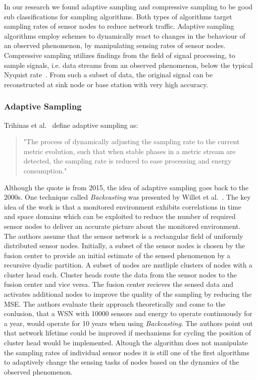 In our research we found adaptive sampling and compressive sampling to be good
sub classifications for sampling algorithms. Both types of algorithms target
sampling rates of sensor nodes to reduce network traffic. Adaptive sampling
algorithms employ schemes to dynamically react to changes in the behaviour of
an observed phenomenon, by manipulating sensing rates of sensor nodes.
Compressive sampling utilizes findings from the field of signal processing, to
sample signals, i.e. data streams from an observed phenomenon, below the
typical Nyquist rate~\cite{candes2008introduction}. From such a subset of data,
the original signal can be reconstructed at sink node or base station with very
high accuracy.

\subsubsection{Adaptive Sampling}
\label{sec:Adaptive Sampling}

Trihinas et al.~\cite{trihinas2015adam} define adaptive sampling as:

\begin{quote}
    "The process of dynamically adjusting the sampling rate to the current
    metric evolution, such that when stable phases in a metric stream are
    detected, the sampling rate is reduced to ease processing and energy
    consumption."
\end{quote}

\par
Although the quote is from 2015, the idea of adaptive sampling goes back to the
2000s. One technique called \textit{Backcasting} was presented by Willet et
al.~\cite{willett2004backcasting}. The key idea of the work is that a monitored
environment exhibits correlations in time and space domains which can be
exploited to reduce the number of required sensor nodes to deliver an accurate
picture about the monitored environment. The authors assume that the sensor
network is a rectangular field of uniformly distributed sensor nodes.
Initially, a subset of the sensor nodes is chosen by the fusion center to
provide an initial estimate of the sensed phenomenon by a recursive dyadic
partition. A subset of nodes are mutliple clusters of nodes with a cluster head
each. Cluster heads route the data from the sensor nodes to the fusion center
and vice versa. The fusion center recieves the sensed data and activates
additional nodes to improve the quality of the sampling by reducing the
\ac{MSE}. The authors evaluate their approach theoretically and come to the
conlusion, that a \ac{WSN} with 10000 sensors and energy to operate
continuously for a year, would operate for 10 years when using
\textit{Backcasting}. The authors point out that network lifetime could be
improved if mechanisms for cycling the position of cluster head would be
implemented. Altough the algorithm does not manipulate the sampling rates of
individual sensor nodes it is still one of the first algorithms to adaptively
change the sensing tasks of nodes based on the dynamics of the observed
phenomenon.

